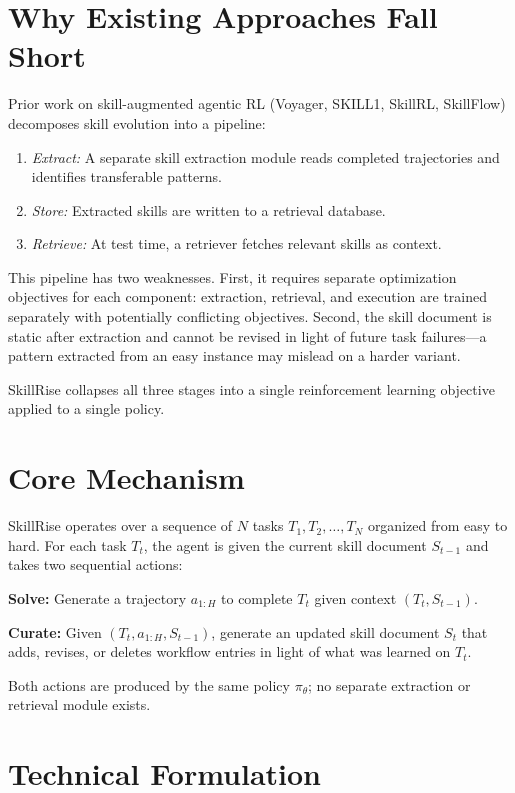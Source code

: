 \documentclass[10pt,twocolumn]{article}
\begin{document}
\section{Why Existing Approaches Fall Short}

Prior work on skill-augmented agentic RL (Voyager, SKILL1, SkillRL,
SkillFlow) decomposes skill evolution into a pipeline:
\begin{enumerate}[itemsep=1pt,parsep=0pt]
  \item \textit{Extract:} A separate skill extraction module reads
    completed trajectories and identifies transferable patterns.
  \item \textit{Store:} Extracted skills are written to a retrieval database.
  \item \textit{Retrieve:} At test time, a retriever fetches relevant
    skills as context.
\end{enumerate}

This pipeline has two weaknesses. First, it requires separate optimization
objectives for each component: extraction, retrieval, and execution are
trained separately with potentially conflicting objectives. Second, the
skill document is static after extraction and cannot be revised in light of
future task failures---a pattern extracted from an easy instance may
mislead on a harder variant.

SkillRise collapses all three stages into a single reinforcement learning
objective applied to a single policy.

\section{Core Mechanism}

SkillRise operates over a sequence of $N$ tasks $T_1, T_2, \ldots, T_N$
organized from easy to hard. For each task $T_t$, the agent is given the
current skill document $S_{t-1}$ and takes two sequential actions:

\textbf{Solve:} Generate a trajectory $a_{1:H}$ to complete $T_t$ given
context $(T_t, S_{t-1})$.

\textbf{Curate:} Given $(T_t, a_{1:H}, S_{t-1})$, generate an updated
skill document $S_t$ that adds, revises, or deletes workflow entries
in light of what was learned on $T_t$.

Both actions are produced by the same policy $\pi_\theta$; no separate
extraction or retrieval module exists.

\section{Technical Formulation}
\end{document}
